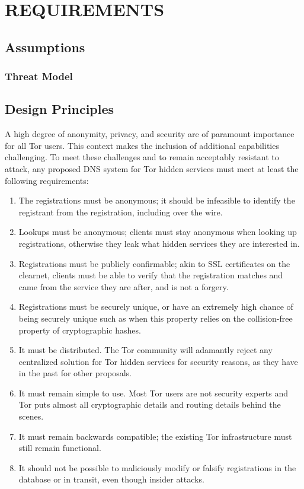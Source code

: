 
\chapter{\uppercase{Requirements}}

\section{Assumptions}



\subsection{Threat Model}



\section{Design Principles}


A high degree of anonymity, privacy, and security are of paramount importance for all Tor users. This context makes the inclusion of additional capabilities challenging. To meet these challenges and to remain acceptably resistant to attack, any proposed DNS system for Tor hidden services must meet at least the following requirements:

\begin{enumerate}
	\item The registrations must be anonymous; it should be infeasible to identify the registrant from the registration, including over the wire.
	\item Lookups must be anonymous; clients must stay anonymous when looking up registrations, otherwise they leak what hidden services they are interested in.
	\item Registrations must be publicly confirmable; akin to SSL certificates on the clearnet, clients must be able to verify that the registration matches and came from the service they are after, and is not a forgery.
	\item Registrations must be securely unique, or have an extremely high chance of being securely unique such as when this property relies on the collision-free property of cryptographic hashes.
	\item It must be distributed. The Tor community will adamantly reject any centralized solution for Tor hidden services for security reasons, as they have in the past for other proposals.
	\item It must remain simple to use. Most Tor users are not security experts and Tor puts almost all cryptographic details and routing details behind the scenes.
	\item It must remain backwards compatible; the existing Tor infrastructure must still remain functional.
	\item It should not be possible to maliciously modify or falsify registrations in the database or in transit, even though insider attacks.
\end{enumerate}

